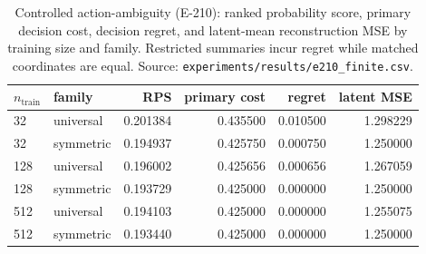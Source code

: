 \begin{table}[h]\centering
\caption{Controlled action-ambiguity (E-210): ranked probability score, primary decision cost,
decision regret, and latent-mean reconstruction MSE by training size and family. Restricted
summaries incur regret while matched coordinates are equal. Source:
\texttt{experiments/results/e210\_finite.csv}.}
\label{tab:e210}
\begin{tabular}{llrrrr}
\toprule
$n_{\mathrm{train}}$ & family & RPS & primary cost & regret & latent MSE \\
\midrule
32 & universal & 0.201384 & 0.435500 & 0.010500 & 1.298229 \\
32 & symmetric & 0.194937 & 0.425750 & 0.000750 & 1.250000 \\
128 & universal & 0.196002 & 0.425656 & 0.000656 & 1.267059 \\
128 & symmetric & 0.193729 & 0.425000 & 0.000000 & 1.250000 \\
512 & universal & 0.194103 & 0.425000 & 0.000000 & 1.255075 \\
512 & symmetric & 0.193440 & 0.425000 & 0.000000 & 1.250000 \\
\bottomrule
\end{tabular}\end{table}
